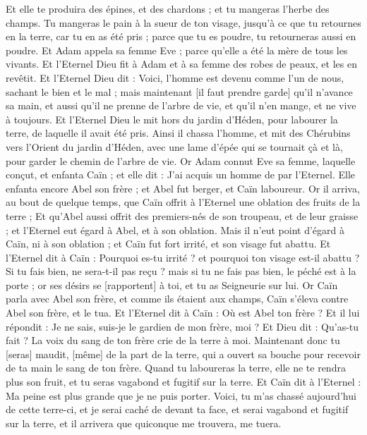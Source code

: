 \begin{multicols}{2}
Et elle te produira des épines, et des chardons ; et tu mangeras l'herbe des champs.
Tu mangeras le pain à la sueur de ton visage, jusqu'à ce que tu retournes en la terre, car tu en as été pris ; parce que tu es poudre, tu retourneras aussi en poudre.
Et Adam appela sa femme Eve ; parce qu'elle a été la mère de tous les vivants.
Et l'Eternel Dieu fit à Adam et à sa femme des robes de peaux, et les en revêtit.
Et l'Eternel Dieu dit : Voici, l'homme est devenu comme l'un de nous, sachant le bien et le mal ; mais maintenant [il faut prendre garde] qu'il n'avance sa main, et aussi qu'il ne prenne de l'arbre de vie, et qu'il n'en mange, et ne vive à toujours.
Et l'Eternel Dieu le mit hors du jardin d'Héden, pour labourer la terre, de laquelle il avait été pris.
Ainsi il chassa l'homme, et mit des Chérubins vers l'Orient du jardin d'Héden, avec une lame d'épée qui se tournait çà et là, pour garder le chemin de l'arbre de vie.
\VerseOne{}Or Adam connut Eve sa femme, laquelle conçut, et enfanta Caïn ; et elle dit : J'ai acquis un homme de par l'Eternel.
Elle enfanta encore Abel son frère ; et Abel fut berger, et Caïn laboureur.
Or il arriva, au bout de quelque temps, que Caïn offrit à l'Eternel une oblation des fruits de la terre ;
Et qu'Abel aussi offrit des premiers-nés de son troupeau, et de leur graisse ; et l'Eternel eut égard à Abel, et à son oblation.
Mais il n'eut point d'égard à Caïn, ni à son oblation ; et Caïn fut fort irrité, et son visage fut abattu.
Et l'Eternel dit à Caïn : Pourquoi es-tu irrité ? et pourquoi ton visage est-il abattu ?
Si tu fais bien, ne sera-t-il pas reçu ? mais si tu ne fais pas bien, le péché est à la porte ; or ses désirs se [rapportent] à toi, et tu as Seigneurie sur lui.
Or Caïn parla avec Abel son frère, et comme ils étaient aux champs, Caïn s'éleva contre Abel son frère, et le tua.
Et l'Eternel dit à Caïn : Où est Abel ton frère ? Et il lui répondit : Je ne sais, suis-je le gardien de mon frère, moi ?
Et Dieu dit : Qu'as-tu fait ? La voix du sang de ton frère crie de la terre à moi.
Maintenant donc tu [seras] maudit, [même] de la part de la terre, qui a ouvert sa bouche pour recevoir de ta main le sang de ton frère.
Quand tu laboureras la terre, elle ne te rendra plus son fruit, et tu seras vagabond et fugitif sur la terre.
Et Caïn dit à l'Eternel : Ma peine est plus grande que je ne puis porter.
Voici, tu m'as chassé aujourd'hui de cette terre-ci, et je serai caché de devant ta face, et serai vagabond et fugitif sur la terre, et il arrivera que quiconque me trouvera, me tuera.

\end{multicols}
